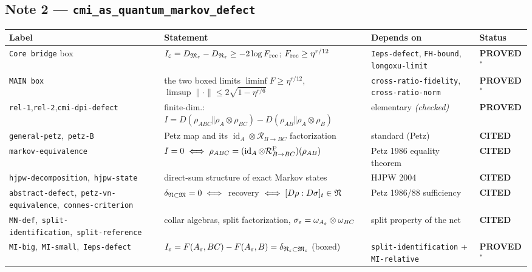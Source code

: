 \documentclass[11pt]{article}
\newcommand{\stPR}{{\color{okgreen}\textsf{\scriptsize\bfseries PROVED}}}
\newcommand{\stPMC}{{\color{teal}\textsf{\scriptsize\bfseries PROVED$^\ast$}}}
\newcommand{\stCIT}{{\color{navy}\textsf{\scriptsize\bfseries CITED}}}
\newcommand{\CMI}{I}
\newcommand{\MI}{F}
\renewcommand{\cR}{\mathcal R}
\newcommand{\id}{\operatorname{id}}
\begin{document}
\subsection{Note 2 --- \texttt{cmi\_as\_quantum\_markov\_defect}}

{\footnotesize\setlength{\emergencystretch}{4em}\sloppy{}\relax{}\relax
\begin{tabularx}{\textwidth}{L{0.150\textwidth} X L{0.215\textwidth} L{0.098\textwidth}}
\toprule
\textbf{Label} & \textbf{Statement} & \textbf{Depends on} & \textbf{Status}\\
\midrule\endhead
\texttt{Core bridge} box & $\CMI_\eps=D_{\cM_\eps}-D_{\cN_\eps}\ge-2\log F_{\rm rec}$; $F_{\rm rec}\ge\eta^{r/12}$ & \texttt{Ieps-defect}, \texttt{FH-bound}, \texttt{longoxu-limit} & \stPMC \\
\texttt{MAIN box} & the two boxed limits $\liminf F\ge\eta^{r/12}$, $\limsup\|\cdot\|\le2\sqrt{1-\eta^{r/6}}$ & \texttt{cross-\allowbreak ratio-\allowbreak fidelity}, \texttt{cross-\allowbreak ratio-\allowbreak norm} & \stPMC \\
\texttt{rel-1},\allowbreak\texttt{rel-2},\allowbreak\texttt{cmi-\allowbreak dpi-\allowbreak defect} & finite-dim.: $\CMI=D(\rho_{ABC}\Vert\rho_A{\otimes}\rho_{BC})-D(\rho_{AB}\Vert\rho_A{\otimes}\rho_B)$ & elementary \emph{(checked)} & \stPR \\
\texttt{general-petz},\allowbreak\ \texttt{petz-B} & Petz map and its $\id_A\otimes\cR_{B\to BC}$ factorization & standard (Petz) & \stCIT \\
\texttt{markov-\allowbreak equivalence} & $\CMI=0\iff\rho_{ABC}=(\id_A{\otimes}\cR^{\rm P}_{B\to BC})(\rho_{AB})$ & Petz 1986 equality theorem & \stCIT \\
\texttt{hjpw-\allowbreak decomposition},\allowbreak\ \texttt{hjpw-state} & direct-sum structure of exact Markov states & HJPW 2004 & \stCIT \\
\texttt{abstract-\allowbreak defect},\allowbreak\ \texttt{petz-\allowbreak vn-\allowbreak equivalence},\allowbreak\ \texttt{connes-\allowbreak criterion} & $\delta_{\mathfrak N\subset\mathfrak M}=0\iff$ recovery $\iff[D\rho:D\sigma]_t\in\mathfrak N$ & Petz 1986/88 sufficiency & \stCIT \\
\texttt{MN-def},\allowbreak\ \texttt{split-\allowbreak identification},\allowbreak\ \texttt{split-\allowbreak reference} & collar algebras, split factorization, $\sigma_\varepsilon=\omega_{A_\varepsilon}\otimes\omega_{BC}$ & split property of the net & \stCIT \\
\texttt{MI-big},\allowbreak\ \texttt{MI-small},\allowbreak\ \texttt{Ieps-defect} & $\CMI_\eps=\MI(A_\eps,BC)-\MI(A_\eps,B)=\delta_{\cN_\eps\subset\cM_\eps}$ (boxed) & \texttt{split-\allowbreak identification} + \texttt{MI-relative} & \stPMC \\

\end{tabularx}}
\end{document}
